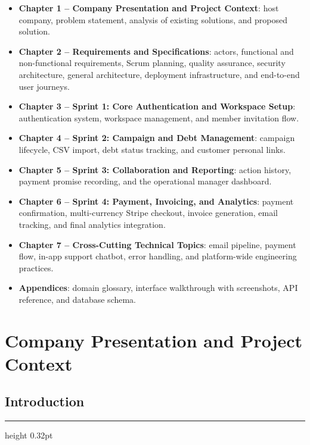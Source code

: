 \documentclass[12pt,a4paper]{report}
\newcommand{\sectionrule}{%
  \vspace{-1pt}%
  {\color{accentblue!22}\hrule height 0.32pt}%
  \vspace{5pt}%
}
\begin{document}
\begin{itemize}
  \item \textbf{Chapter 1 -- Company Presentation and Project Context}:
        host company, problem statement, analysis of existing solutions, and
        proposed solution.
  \item \textbf{Chapter 2 -- Requirements and Specifications}:
        actors, functional and non-functional requirements, Scrum planning,
        quality assurance, security architecture, general architecture, deployment
        infrastructure, and end-to-end user journeys.
  \item \textbf{Chapter 3 -- Sprint 1: Core Authentication and Workspace Setup}:
        authentication system, workspace management, and member invitation flow.
  \item \textbf{Chapter 4 -- Sprint 2: Campaign and Debt Management}:
        campaign lifecycle, CSV import, debt status tracking, and customer personal
        links.
  \item \textbf{Chapter 5 -- Sprint 3: Collaboration and Reporting}:
        action history, payment promise recording, and the operational manager
        dashboard.
  \item \textbf{Chapter 6 -- Sprint 4: Payment, Invoicing, and Analytics}:
        payment confirmation, multi-currency Stripe checkout, invoice generation,
        email tracking, and final analytics integration.
  \item \textbf{Chapter 7 -- Cross-Cutting Technical Topics}:
        email pipeline, payment flow, in-app support chatbot, error handling,
        and platform-wide engineering practices.
  \item \textbf{Appendices}:
        domain glossary, interface walkthrough with screenshots, API reference,
        and database schema.
\end{itemize}

\chapter{Company Presentation and Project Context}

\section*{Introduction}
{}
\sectionrule
\end{document}

